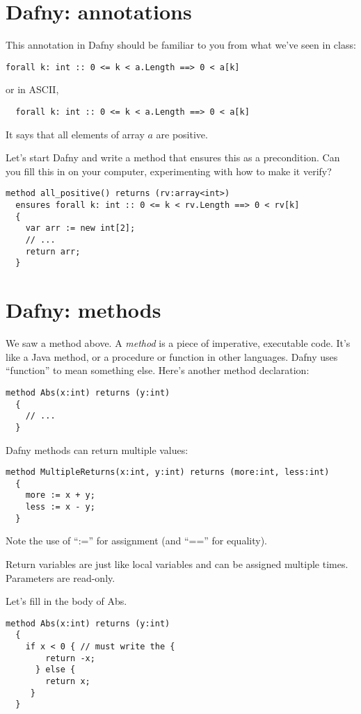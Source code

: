 \documentclass[11pt]{article}
\begin{document}
\section*{Dafny: annotations}
This annotation in Dafny should be familiar to you from what we've seen in class:
\begin{lstlisting}[language=dafny]
  forall k: int :: 0 <= k < a.Length ==> 0 < a[k]
\end{lstlisting}
or in ASCII,
\begin{verbatim}
  forall k: int :: 0 <= k < a.Length ==> 0 < a[k]
\end{verbatim}
It says that all elements of array $a$ are positive.

Let's start Dafny and write a method that ensures this as a precondition.
Can you fill this in on your computer, experimenting with how to make it verify?
\begin{lstlisting}[language=dafny]
  method all_positive() returns (rv:array<int>)
  ensures forall k: int :: 0 <= k < rv.Length ==> 0 < rv[k]
  {
    var arr := new int[2];
    // ...
    return arr;
  }  
\end{lstlisting}

\section*{Dafny: methods}
We saw a method above. A \emph{method} is a piece of imperative, executable code.
It's like a Java method, or a procedure or function in other languages. Dafny uses
``function'' to mean something else. Here's another method declaration:
\begin{lstlisting}[language=dafny]
  method Abs(x:int) returns (y:int)
  {
    // ...
  }
\end{lstlisting}
Dafny methods can return multiple values:
\begin{lstlisting}[language=dafny]
  method MultipleReturns(x:int, y:int) returns (more:int, less:int)
  {
    more := x + y;
    less := x - y;
  }
\end{lstlisting}
Note the use of ``:='' for assignment (and ``=='' for equality).

Return variables are just like local variables and can be assigned multiple times.
Parameters are read-only.

Let's fill in the body of Abs.
\begin{lstlisting}[language=dafny]
  method Abs(x:int) returns (y:int)
  {
    if x < 0 { // must write the {
        return -x;
      } else {
        return x;
     }
  }
\end{lstlisting}
\end{document}
